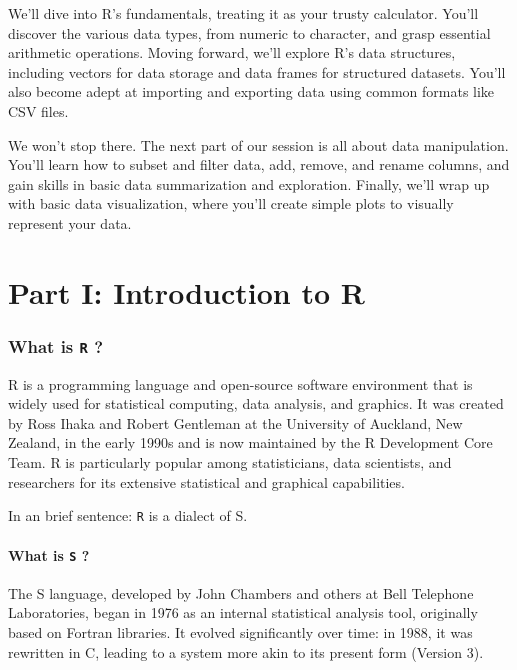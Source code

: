 \documentclass[
]{book}
\begin{document}
We'll dive into R's fundamentals, treating it as your trusty calculator. You'll discover the various data types, from numeric to character, and grasp essential arithmetic operations. Moving forward, we'll explore R's data structures, including vectors for data storage and data frames for structured datasets. You'll also become adept at importing and exporting data using common formats like CSV files.

We won't stop there. The next part of our session is all about data manipulation. You'll learn how to subset and filter data, add, remove, and rename columns, and gain skills in basic data summarization and exploration. Finally, we'll wrap up with basic data visualization, where you'll create simple plots to visually represent your data.

\chapter*{Part I: Introduction to R}\label{part-i-introduction-to-r}

\subsection*{\texorpdfstring{What is \texttt{R} ?}{What is R ?}}\label{what-is-r}

R is a programming language and open-source software environment that is widely used for statistical computing, data analysis, and graphics. It was created by Ross Ihaka and Robert Gentleman at the University of Auckland, New Zealand, in the early 1990s and is now maintained by the R Development Core Team. R is particularly popular among statisticians, data scientists, and researchers for its extensive statistical and graphical capabilities.

In an brief sentence: \texttt{R} is a dialect of S.

\subsubsection*{\texorpdfstring{What is \texttt{S} ?}{What is S ?}}\label{what-is-s}

The S language, developed by John Chambers and others at Bell Telephone Laboratories, began in 1976 as an internal statistical analysis tool, originally based on Fortran libraries. It evolved significantly over time: in 1988, it was rewritten in C, leading to a system more akin to its present form (Version 3).
\end{document}
